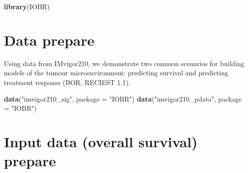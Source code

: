 \documentclass[
  12pt,
]{book}
\newenvironment{Shaded}{\begin{snugshade}}{\end{snugshade}}
\newcommand{\AttributeTok}[1]{\textcolor[rgb]{0.13,0.29,0.53}{#1}}
\newcommand{\FunctionTok}[1]{\textcolor[rgb]{0.13,0.29,0.53}{\textbf{#1}}}
\newcommand{\NormalTok}[1]{#1}
\newcommand{\OtherTok}[1]{\textcolor[rgb]{0.56,0.35,0.01}{#1}}
\newcommand{\SpecialCharTok}[1]{\textcolor[rgb]{0.81,0.36,0.00}{\textbf{#1}}}
\newcommand{\StringTok}[1]{\textcolor[rgb]{0.31,0.60,0.02}{#1}}
\begin{document}
\begin{Shaded}
\begin{Highlighting}[]
\FunctionTok{library}\NormalTok{(IOBR)}
\end{Highlighting}
\end{Shaded}

\hypertarget{data-prepare}{%
\section{Data prepare}\label{data-prepare}}

Using data from IMvigor210, we demonstrate two common scenarios for building models of the tumour microenvironment: predicting survival and predicting treatment response (BOR, RECIEST 1.1).

\begin{Shaded}
\begin{Highlighting}[]
\FunctionTok{data}\NormalTok{(}\StringTok{"imvigor210\_sig"}\NormalTok{, }\AttributeTok{package =} \StringTok{"IOBR"}\NormalTok{)}
\FunctionTok{data}\NormalTok{(}\StringTok{"imvigor210\_pdata"}\NormalTok{, }\AttributeTok{package =} \StringTok{"IOBR"}\NormalTok{)}
\end{Highlighting}
\end{Shaded}

\hypertarget{input-data-overall-survival-prepare}{%
\section{Input data (overall survival) prepare}\label{input-data-overall-survival-prepare}}

\begin{Shaded}
\end{Shaded}
\end{document}
